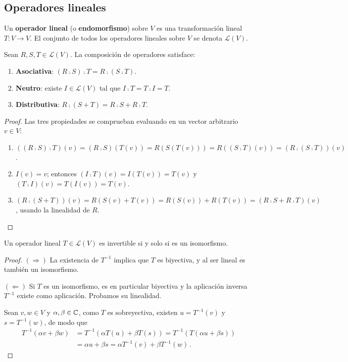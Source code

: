 \subsection{Operadores lineales}

\begin{defi}
  Un \textbf{operador lineal} (o \textbf{endomorfismo}) sobre $V$ es una transformación lineal $T\colon V\to V$. El conjunto de todos los operadores lineales sobre $V$ se denota $\mathcal{L}(V)$.
\end{defi}

\begin{prop}
  \label{prop:propiedadesOperadores}
  Sean $R,S,T\in\mathcal{L}(V)$. La composición de operadores satisface:
  \begin{enumerate}
    \item \textbf{Asociativa}: $(R\comp S)\comp T = R\comp(S\comp T)$.
    \item \textbf{Neutro}: existe $I\in\mathcal{L}(V)$ tal que $I\comp T=T\comp I=T$.
    \item \textbf{Distributiva}: $R\comp(S+T)=R\comp S+R\comp T$.
  \end{enumerate}
\end{prop}
\begin{proof}
  Las tres propiedades se comprueban evaluando en un vector arbitrario $v\in V$:
  \begin{enumerate}
    \item $((R\comp S)\comp T)(v)=(R\comp S)(T(v))=R(S(T(v)))=R((S\comp T)(v))=(R\comp(S\comp T))(v)$.
    \item $I(v)=v$; entonces $(I\comp T)(v)=I(T(v))=T(v)$ y $(T\comp I)(v)=T(I(v))=T(v)$.
    \item $(R\comp(S+T))(v)=R(S(v)+T(v))=R(S(v))+R(T(v))=(R\comp S+R\comp T)(v)$, usando la linealidad de $R$.
  \end{enumerate}
\end{proof}

\begin{theo}
  Un operador lineal $T\in\mathcal{L}(V)$ es invertible si y solo si es un isomorfismo.
\end{theo}
\begin{proof}
  $(\Rightarrow)$ La existencia de $T^{-1}$ implica que $T$ es biyectiva, y al ser lineal es también un isomorfismo.

  $(\Leftarrow)$ Si $T$ es un isomorfismo, es en particular biyectiva y la aplicación inversa $T^{-1}$ existe como aplicación. Probamos su linealidad.

  Sean $v,w\in V$ y $\alpha,\beta\in\mathbb{C}$, como $T$ es sobreyectiva, existen $u=T^{-1}(v)$ y $s=T^{-1}(w)$, de modo que
  \begin{align*}
    T^{-1}(\alpha v+\beta w) & = T^{-1}(\alpha T(u)+\beta T(s)) = T^{-1}(T(\alpha u+\beta s)) \\
                             & = \alpha u+\beta s = \alpha T^{-1}(v)+\beta T^{-1}(w)\,.
  \end{align*}
\end{proof}

